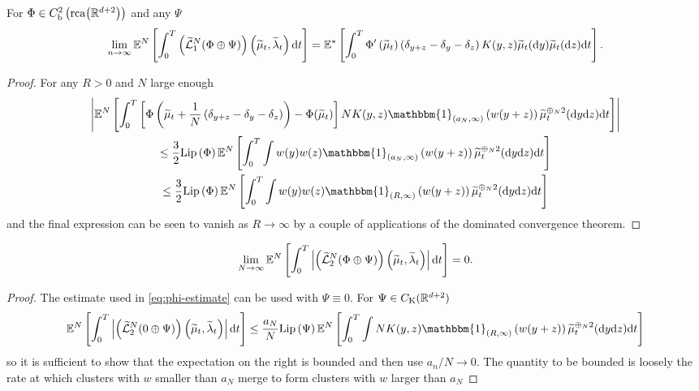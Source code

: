 \begin{proposition} 
For $\Phi \in C^2_\mathrm{b}\left(\mathrm{rca}{\left({\mathbb{R}^{d+2}}\right)}\right)$ and any $\Psi$
\begin{equation}
    \lim_{n\rightarrow \infty} \mathbb{E}^N\left[\int_0^T \left(\widetilde{\mathcal{L}}^N_1 (\Phi \oplus \Psi) \right)\left(\widetilde{\mu}_t, \widetilde{\lambda}_t\right)\mathrm{d} t\right]
    =
    \mathbb{E}^\ast\left[\int_0^T \Phi^\prime\left(\widetilde{\mu}_t\right)\left(\delta_{y+z}-\delta_y - \delta_z\right)K(y,z)\widetilde{\mu}_t(\mathrm{d} y)\widetilde{\mu}_t(\mathrm{d} z) \mathrm{d} t\right].
\end{equation}
\end{proposition}
\begin{proof}
For any $R>0$ and $N$ large enough
\begin{multline}\label{eq:phi-estimate}
    \abs{\EE^N\left[\int_0^T \left[\Phi\left(\tmu_t + \frac1N\left(\delta_{y+z}-\delta_y - \delta_z\right)\right) - \Phi(\tmu_t)\right]
      NK(y,z)\mathbbm{1}_{(a_N,\infty)}\left(w(y+z)\right)\tmu^{\oplus_N 2}_t(\dd y\dd z) \dd t \right]} \\
    \leq
    \frac32 \lip{\Phi}\EE^N\left[\int_0^T \int w(y)w(z)\mathbbm{1}_{(a_N,\infty)}\left(w(y+z)\right)\tmu^{\oplus_N 2}_t(\dd y\dd z) \dd t \right]\\
    \leq
    \frac32 \lip{\Phi}\EE^N\left[\int_0^T \int w(y)w(z)\mathbbm{1}_{(R,\infty)}\left(w(y+z)\right)\tmu^{\oplus_N 2}_t(\dd y\dd z) \dd t \right]
\end{multline}
and the final expression can be seen to vanish as $R\rightarrow \infty$ by a couple of applications of the dominated convergence theorem.
\end{proof}

\begin{proposition}

\end{proposition}
\begin{equation*}
    \lim_{N\rightarrow \infty} \EE^N\left[\int_0^T \abs{\left(\widetilde{\mathcal{L}}^N_2 (\Phi \oplus \Psi) \right)\left(\tmu_t, \tl_t\right)}\dd t\right]
    = 0.
\end{equation*}
\begin{proof}
The estimate used in \eqref{eq:phi-estimate} can be used with $\Psi \equiv 0$. 
For $\Psi \in C_\mathrm{K}(\mathbb{R}^{d+2})$
\begin{equation*}
    \EE^N\left[\int_0^T \abs{\left(\widetilde{\mathcal{L}}^N_2 (0 \oplus \Psi) \right)\left(\tmu_t, \tl_t\right)}\dd t\right]
    \leq
    \frac{a_N}{N}\lip{\Psi} \EE^N\left[\int_0^T \int NK(y,z)\mathbbm{1}_{(R,\infty)}\left(w(y+z)\right) \tmu_t^{\oplus_N 2}(\dd y \dd z)\dd t\right]
\end{equation*}
so it is sufficient to show that the expectation on the right is bounded and then use $a_n / N \rightarrow 0$.  The quantity to be bounded is loosely the rate at which clusters with $w$ smaller than $a_N$ merge to form clusters with $w$ larger than $a_N$ 
\end{proof}

